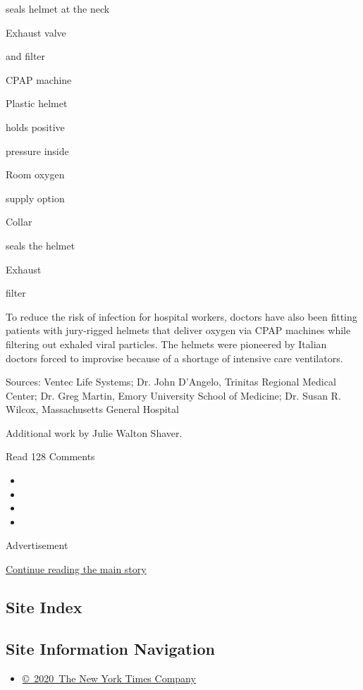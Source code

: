 seals helmet at the neck

Exhaust valve

and filter

CPAP machine

Plastic helmet

holds positive

pressure inside

Room oxygen

supply option

Collar

seals the helmet

Exhaust

filter

To reduce the risk of infection for hospital workers, doctors have also
been fitting patients with jury-rigged helmets that deliver oxygen via
CPAP machines while filtering out exhaled viral particles. The helmets
were pioneered by Italian doctors forced to improvise because of a
shortage of intensive care ventilators.

Sources: Ventec Life Systems; Dr. John D'Angelo, Trinitas Regional
Medical Center; Dr. Greg Martin, Emory University School of Medicine;
Dr. Susan R. Wilcox, Massachusetts General Hospital

Additional work by Julie Walton Shaver.

Read 128 Comments

\begin{itemize}
\item
\item
\item
\item
\end{itemize}

Advertisement

\protect\hyperlink{after-bottom}{Continue reading the main story}

\hypertarget{site-index}{%
\subsection{Site Index}\label{site-index}}

\hypertarget{site-information-navigation}{%
\subsection{Site Information
Navigation}\label{site-information-navigation}}

\begin{itemize}
\tightlist
\item
  \href{https://help.nytimes3xbfgragh.onion/hc/en-us/articles/115014792127-Copyright-notice}{©~2020~The
  New York Times Company}
\end{itemize}


